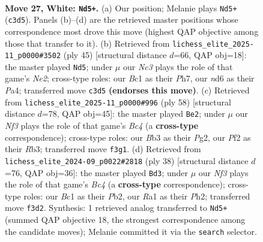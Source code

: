 \documentclass[11pt]{article}
\begin{document}
\clearpage

\begin{figure}[p]\centering
\begin{subfigure}{0.46\textwidth}\centering
\resizebox{\linewidth}{!}{%
\newchessgame
\chessboard[
  setfen={r4r1b/1ppbk3/p2n4/4pp2/7R/PBN2N2/1P2KPP1/R1B5 w - - 5 27},
  showmover=false,
  pgfstyle=straightmove, color=movearrow, markmove={c3-d5}
]}
\caption{}
\end{subfigure}\hfill
\begin{subfigure}{0.46\textwidth}\centering
\resizebox{\linewidth}{!}{%
\newchessgame
\chessboard[
  setfen={r5k1/4n1pp/5p2/1p6/pbrP4/5NP1/1R2PPKP/BR6 b - - 5 23},
  showmover=false,
  pgfstyle=straightmove, color=movearrow, markmove={e7-d5}
]}
\caption{}
\end{subfigure}
\\[4pt]
\begin{subfigure}{0.46\textwidth}\centering
\resizebox{\linewidth}{!}{%
\newchessgame
\chessboard[
  setfen={r2n4/r2bk1pp/p1p2p2/P3p3/1NB5/1R2P3/1PP3PP/3R2K1 w - - 10 30},
  showmover=false,
  pgfstyle=straightmove, color=movearrow, markmove={c4-e2}
]}
\caption{}
\end{subfigure}\hfill
\begin{subfigure}{0.46\textwidth}\centering
\resizebox{\linewidth}{!}{%
\newchessgame
\chessboard[
  setfen={r1r5/1p1bkp2/p1n1pp1p/8/2B5/P1R1PN2/1P2KPPP/3R4 w - - 3 20},
  showmover=false,
  pgfstyle=straightmove, color=movearrow, markmove={c4-d3}
]}
\caption{}
\end{subfigure}
\caption{\textbf{Move 27, White: \texttt{Nd5+}.} (a) Our position; Melanie plays \texttt{Nd5+} (\texttt{c3d5}). Panels (b)--(d) are the retrieved master positions whose correspondence most drove this move (highest QAP objective among those that transfer to it). (b) Retrieved from \texttt{lichess\_elite\_2025-11\_p0000\#3502} (ply 45) [structural distance $d$=66, QAP obj=18]: the master played \texttt{Nd5}; under $\mu$ our \emph{Nc3} plays the role of that game's \emph{Ne2}; cross-type roles: our \emph{B}c1 as their \emph{P}h7, our \emph{n}d6 as their \emph{P}a4; transferred move \texttt{c3d5} \textbf{(endorses this move)}. (c) Retrieved from \texttt{lichess\_elite\_2025-11\_p0000\#996} (ply 58) [structural distance $d$=78, QAP obj=45]: the master played \texttt{Be2}; under $\mu$ our \emph{Nf3} plays the role of that game's \emph{Bc4} (a \textbf{cross-type} correspondence); cross-type roles: our \emph{B}b3 as their \emph{P}g2, our \emph{P}f2 as their \emph{R}b3; transferred move \texttt{f3g1}. (d) Retrieved from \texttt{lichess\_elite\_2024-09\_p0022\#2818} (ply 38) [structural distance $d$=76, QAP obj=36]: the master played \texttt{Bd3}; under $\mu$ our \emph{Nf3} plays the role of that game's \emph{Bc4} (a \textbf{cross-type} correspondence); cross-type roles: our \emph{B}c1 as their \emph{P}b2, our \emph{R}a1 as their \emph{P}h2; transferred move \texttt{f3d2}. Synthesis: 1 retrieved analog transferred to \texttt{Nd5+} (summed QAP objective 18, the strongest correspondence among the candidate moves); Melanie committed it via the \texttt{search} selector.}
\label{fig:thought-m52}
\end{figure}
\end{document}

